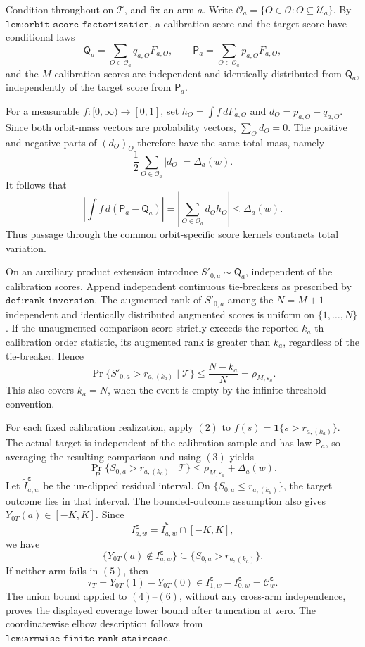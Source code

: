 Condition throughout on \(\mathcal T\), and fix an arm \(a\). Write \(\mathcal O_a=\{O\in\mathcal O:O\subseteq\mathcal U_a\}\). By \(\texttt{lem:orbit-score-factorization}\), a calibration score and the target score have conditional laws
\[
\mathsf Q_a=\sum_{O\in\mathcal O_a}q_{a,O}F_{a,O},
\qquad
\mathsf P_a=\sum_{O\in\mathcal O_a}p_{a,O}F_{a,O},
\tag{1}
\]
and the \(M\) calibration scores are independent and identically distributed from \(\mathsf Q_a\), independently of the target score from \(\mathsf P_a\).

For a measurable \(f:[0,\infty)\to[0,1]\), set \(h_O=\int f\,dF_{a,O}\) and \(d_O=p_{a,O}-q_{a,O}\). Since both orbit-mass vectors are probability vectors, \(\sum_Od_O=0\). The positive and negative parts of \((d_O)_O\) therefore have the same total mass, namely
\[
\frac12\sum_{O\in\mathcal O_a}|d_O|=\Delta_a(w).
\]
It follows that
\[
\left|\int f\,d(\mathsf P_a-\mathsf Q_a)\right|
=\left|\sum_{O\in\mathcal O_a}d_Oh_O\right|
\le\Delta_a(w).
\tag{2}
\]
Thus passage through the common orbit-specific score kernels contracts total variation.

On an auxiliary product extension introduce \(S'_{0,a}\sim\mathsf Q_a\), independent of the calibration scores. Append independent continuous tie-breakers as prescribed by \(\texttt{def:rank-inversion}\). The augmented rank of \(S'_{0,a}\) among the \(N=M+1\) independent and identically distributed augmented scores is uniform on \(\{1,\ldots,N\}\). If the unaugmented comparison score strictly exceeds the reported \(k_a\)-th calibration order statistic, its augmented rank is greater than \(k_a\), regardless of the tie-breaker. Hence
\[
\Pr\{S'_{0,a}>r_{a,(k_a)}\mid\mathcal T\}
\le\frac{N-k_a}{N}=\rho_{M,\varepsilon_a}.
\tag{3}
\]
This also covers \(k_a=N\), when the event is empty by the infinite-threshold convention.

For each fixed calibration realization, apply \((2)\) to \(f(s)=\mathbf 1\{s>r_{a,(k_a)}\}\). The actual target is independent of the calibration sample and has law \(\mathsf P_a\), so averaging the resulting comparison and using \((3)\) yields
\[
\Pr_P\{S_{0,a}>r_{a,(k_a)}\mid\mathcal T\}
\le\rho_{M,\varepsilon_a}+\Delta_a(w).
\tag{4}
\]
Let \(\widetilde I^{\boldsymbol\varepsilon}_{a,w}\) be the un-clipped residual interval. On \(\{S_{0,a}\le r_{a,(k_a)}\}\), the target outcome lies in that interval. The bounded-outcome assumption also gives \(Y_{0T}(a)\in[-K,K]\). Since
\[
I^{\boldsymbol\varepsilon}_{a,w}=\widetilde I^{\boldsymbol\varepsilon}_{a,w}\cap[-K,K],
\]
we have
\[
\{Y_{0T}(a)\notin I^{\boldsymbol\varepsilon}_{a,w}\}
\subseteq
\{S_{0,a}>r_{a,(k_a)}\}.
\tag{5}
\]
If neither arm fails in \((5)\), then
\[
\tau_T=Y_{0T}(1)-Y_{0T}(0)
\in I^{\boldsymbol\varepsilon}_{1,w}-I^{\boldsymbol\varepsilon}_{0,w}
=\mathcal C^{\boldsymbol\varepsilon}_w.
\tag{6}
\]
The union bound applied to \((4)\)--\((6)\), without any cross-arm independence, proves the displayed coverage lower bound after truncation at zero. The coordinatewise elbow description follows from \(\texttt{lem:armwise-finite-rank-staircase}\).

